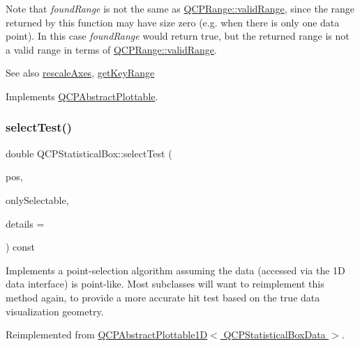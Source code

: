 Note that {\itshape found\+Range} is not the same as \hyperlink{class_q_c_p_range_ab38bd4841c77c7bb86c9eea0f142dcc0}{Q\+C\+P\+Range\+::valid\+Range}, since the range returned by this function may have size zero (e.\+g. when there is only one data point). In this case {\itshape found\+Range} would return true, but the returned range is not a valid range in terms of \hyperlink{class_q_c_p_range_ab38bd4841c77c7bb86c9eea0f142dcc0}{Q\+C\+P\+Range\+::valid\+Range}.

\begin{DoxySeeAlso}{See also}
\hyperlink{class_q_c_p_abstract_plottable_a1491c4a606bccd2d09e65e11b79eb882}{rescale\+Axes}, \hyperlink{class_q_c_p_statistical_box_a77d2d13301dfe60c13adfaa17fc1802f}{get\+Key\+Range} 
\end{DoxySeeAlso}


Implements \hyperlink{class_q_c_p_abstract_plottable_a4de773988b21ed090fddd27c6a3a3dcb}{Q\+C\+P\+Abstract\+Plottable}.

\mbox{\label{class_q_c_p_statistical_box_a1607fa92f829c631107c20ccb2d70a6d}} 
\subsubsection{\texorpdfstring{select\+Test()}{selectTest()}\hspace{0.1cm}{\footnotesize\ttfamily [1/2]}}
{\footnotesize\ttfamily double Q\+C\+P\+Statistical\+Box\+::select\+Test (\begin{DoxyParamCaption}\item[{const Q\+PointF \&}]{pos,  }\item[{bool}]{only\+Selectable,  }\item[{Q\+Variant $\ast$}]{details = {} }\end{DoxyParamCaption}) const\hspace{0.3cm}{\ttfamily [virtual]}}

Implements a point-\/selection algorithm assuming the data (accessed via the 1D data interface) is point-\/like. Most subclasses will want to reimplement this method again, to provide a more accurate hit test based on the true data visualization geometry.

Reimplemented from \hyperlink{class_q_c_p_abstract_plottable1_d_a071e2df66ba1746067dfcb5e27947b43}{Q\+C\+P\+Abstract\+Plottable1\+D$<$ Q\+C\+P\+Statistical\+Box\+Data $>$}.

